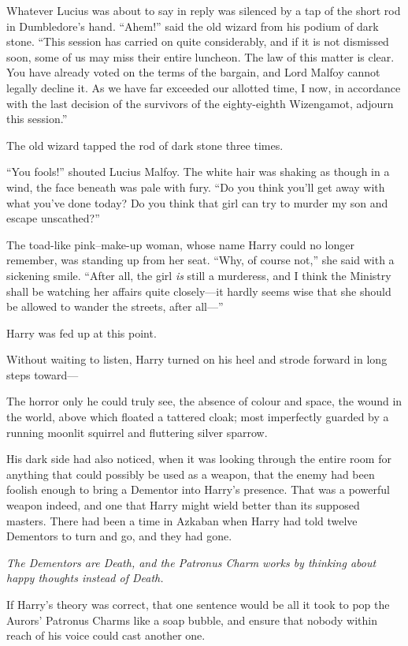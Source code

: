 Whatever Lucius was about to say in reply was silenced by a tap of the short rod in Dumbledore’s hand. “Ahem!” said the old wizard from his podium of dark stone. “This session has carried on quite considerably, and if it is not dismissed soon, some of us may miss their entire luncheon. The law of this matter is clear. You have already voted on the terms of the bargain, and Lord Malfoy cannot legally decline it. As we have far exceeded our allotted time, I now, in accordance with the last decision of the survivors of the eighty-eighth Wizengamot, adjourn this session.”

The old wizard tapped the rod of dark stone three times.

“You fools!” shouted Lucius Malfoy. The white hair was shaking as though in a wind, the face beneath was pale with fury. “Do you think you’ll get away with what you’ve done today? Do you think that girl can try to murder my son and escape unscathed?”

The toad-like pink–make-up woman, whose name Harry could no longer remember, was standing up from her seat. “Why, of course not,” she said with a sickening smile. “After all, the girl \emph{is} still a murderess, and I think the Ministry shall be watching her affairs quite closely—it hardly seems wise that she should be allowed to wander the streets, after all—”

Harry was fed up at this point.

Without waiting to listen, Harry turned on his heel and strode forward in long steps toward—

The horror only he could truly see, the absence of colour and space, the wound in the world, above which floated a tattered cloak; most imperfectly guarded by a running moonlit squirrel and fluttering silver sparrow.

His dark side had also noticed, when it was looking through the entire room for anything that could possibly be used as a weapon, that the enemy had been foolish enough to bring a Dementor into Harry’s presence. That was a powerful weapon indeed, and one that Harry might wield better than its supposed masters. There had been a time in Azkaban when Harry had told twelve Dementors to turn and go, and they had gone.

\emph{The Dementors are Death, and the Patronus Charm works by thinking about happy thoughts instead of Death.}

If Harry’s theory was correct, that one sentence would be all it took to pop the Aurors’ Patronus Charms like a soap bubble, and ensure that nobody within reach of his voice could cast another one.

